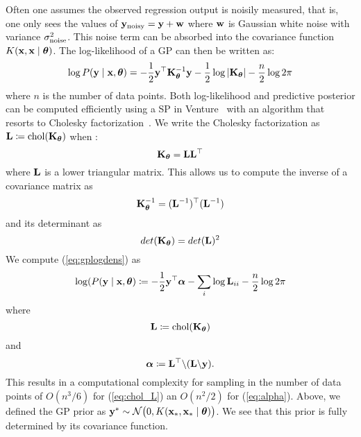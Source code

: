 Often one assumes the observed regression output is noisily measured, that is,
one only sees the values of $\mathbf{y}_{\textrm{noisy}} = \mathbf{y} + \mathbf{w}$ where $\mathbf{w}$ is
Gaussian white noise with variance $\sigma_{\textrm{noise}}^2$. This noise term can be
absorbed into the covariance function $K(\mathbf{x},\mathbf{x} \mid \bm{\theta})$.
The log-likelihood of a \ac{GP} can then be written as:
\begin{equation}
\label{eq:gplogdens}
\log P(\mathbf{y} \mid \mathbf{x},\bm{\theta}) =
-\frac12 \mathbf{y}^\top 
\mathbf{K}_{\bm{\theta}}^{-1} \mathbf{y}
- \frac12\log \left\lvert \mathbf{K}_{\bm{\theta}} \right\rvert
- \frac{n}{2}\log 2\pi
\end{equation}
where $n$ is the number of data points.
Both log-likelihood and predictive posterior can be computed efficiently using a \ac{SP} in Venture~\citep{mansinghka2014venture}
with an algorithm that resorts to Cholesky factorization~\citep[chap. 2]{rasmussen2006gaussian}.
We write the Cholesky factorization as 
$\mathbf{L}\coloneqq \text{chol}(\mathbf{K}_{\bm{\theta}})$ when
:
\begin{equation}
\mathbf{K}_{\bm{\theta}} = \mathbf{L}\mathbf{L}^\top
\end{equation}
where $\mathbf{L}$ is a lower triangular matrix. This allows us to compute the inverse of a covariance matrix as
\begin{equation}
\mathbf{K}_{\bm{\theta}}^{-1} = (\mathbf{L}^{-1})^\top (\mathbf{L}^{-1})
\end{equation}
and its determinant as 
\begin{equation}
det(\mathbf{K}_{\bm{\theta}}) = det(\mathbf{L})^2
\end{equation}
We compute (\ref{eq:gplogdens}) as
\begin{equation}
\log(P(\mathbf{y} \mid \mathbf{x}, \bm{\theta})\coloneqq - \frac{1}{2} \mathbf{y}^\top \bm{\alpha} - \sum_i \log \mathbf{L}_{ii} - \frac{n}{2} \log 2 \pi
\end{equation}
where 
\begin{equation}
\label{eq:chol_L}
\mathbf{L} \coloneqq \text{chol}(\mathbf{K}_{\bm{\theta}})
\end{equation}
and 
\begin{equation}
\label{eq:alpha}
\bm{\alpha} \coloneqq  \mathbf{L}^\top \backslash(\mathbf{L} \backslash \mathbf{y}). 
\end{equation}
This results in a computational complexity for sampling in the number of data points of $O(n^3/6)$ for (\ref{eq:chol_L}) an $O(n^2/2)$ for (\ref{eq:alpha}). 
Above, we defined the \ac{GP} prior as $\mathbf{y}^* \sim
\mathcal{N}\big(0,K(\mathbf{x}_*,\mathbf{x}_* \mid \bm{\theta} )\big)$.
We see that this prior is fully determined by its covariance function.
